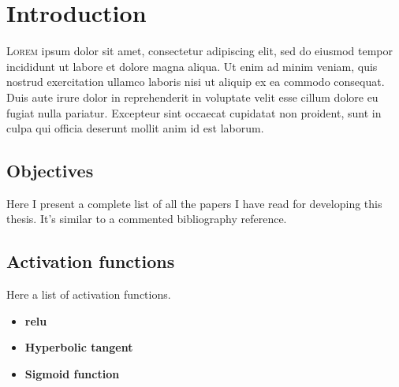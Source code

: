 

\chapter{Introduction}\label{cha:introduction}



\lettrine{L}{orem} ipsum dolor sit amet, consectetur
adipiscing elit, sed do eiusmod tempor incididunt ut labore et dolore magna
aliqua. Ut enim ad minim veniam, quis nostrud exercitation ullamco laboris nisi
ut aliquip ex ea commodo consequat. Duis aute irure dolor in reprehenderit in
voluptate velit esse cillum dolore eu fugiat nulla pariatur. Excepteur sint
occaecat cupidatat non proident, sunt in culpa qui officia deserunt mollit anim
id est laborum.


\section{Objectives}

Here I present a complete list of all the papers I have read for developing this
thesis. It's similar to a commented bibliography reference.


\section{Activation functions}
Here a list of activation functions.


\begin{itemize}
  \item \textbf{\acf*{relu}}
  \item \textbf{Hyperbolic tangent}
  \item \textbf{Sigmoid function}
\end{itemize}

